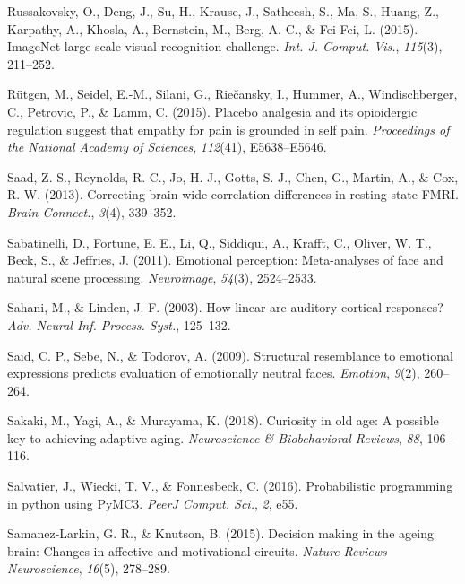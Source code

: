 \documentclass[11pt,american,a4paper,oneside,]{memoir} %
\begin{document}
\leavevmode\hypertarget{ref-Russakovsky2015-oo}{}%
Russakovsky, O., Deng, J., Su, H., Krause, J., Satheesh, S., Ma, S., Huang, Z., Karpathy, A., Khosla, A., Bernstein, M., Berg, A. C., \& Fei-Fei, L. (2015). ImageNet large scale visual recognition challenge. \emph{Int. J. Comput. Vis.}, \emph{115}(3), 211--252.

\leavevmode\hypertarget{ref-rutgen2015placebo}{}%
Rütgen, M., Seidel, E.-M., Silani, G., Riečansky, I., Hummer, A., Windischberger, C., Petrovic, P., \& Lamm, C. (2015). Placebo analgesia and its opioidergic regulation suggest that empathy for pain is grounded in self pain. \emph{Proceedings of the National Academy of Sciences}, \emph{112}(41), E5638--E5646.

\leavevmode\hypertarget{ref-Saad2013-zd}{}%
Saad, Z. S., Reynolds, R. C., Jo, H. J., Gotts, S. J., Chen, G., Martin, A., \& Cox, R. W. (2013). Correcting brain-wide correlation differences in resting-state FMRI. \emph{Brain Connect.}, \emph{3}(4), 339--352.

\leavevmode\hypertarget{ref-sabatinelli2011emotional}{}%
Sabatinelli, D., Fortune, E. E., Li, Q., Siddiqui, A., Krafft, C., Oliver, W. T., Beck, S., \& Jeffries, J. (2011). Emotional perception: Meta-analyses of face and natural scene processing. \emph{Neuroimage}, \emph{54}(3), 2524--2533.

\leavevmode\hypertarget{ref-Sahani2003-kk}{}%
Sahani, M., \& Linden, J. F. (2003). How linear are auditory cortical responses? \emph{Adv. Neural Inf. Process. Syst.}, 125--132.

\leavevmode\hypertarget{ref-Said2009-tf}{}%
Said, C. P., Sebe, N., \& Todorov, A. (2009). Structural resemblance to emotional expressions predicts evaluation of emotionally neutral faces. \emph{Emotion}, \emph{9}(2), 260--264.

\leavevmode\hypertarget{ref-sakaki2018curiosity}{}%
Sakaki, M., Yagi, A., \& Murayama, K. (2018). Curiosity in old age: A possible key to achieving adaptive aging. \emph{Neuroscience \& Biobehavioral Reviews}, \emph{88}, 106--116.

\leavevmode\hypertarget{ref-Salvatier2016-ko}{}%
Salvatier, J., Wiecki, T. V., \& Fonnesbeck, C. (2016). Probabilistic programming in python using PyMC3. \emph{PeerJ Comput. Sci.}, \emph{2}, e55.

\leavevmode\hypertarget{ref-samanez2015decision}{}%
Samanez-Larkin, G. R., \& Knutson, B. (2015). Decision making in the ageing brain: Changes in affective and motivational circuits. \emph{Nature Reviews Neuroscience}, \emph{16}(5), 278--289.
\end{document}

